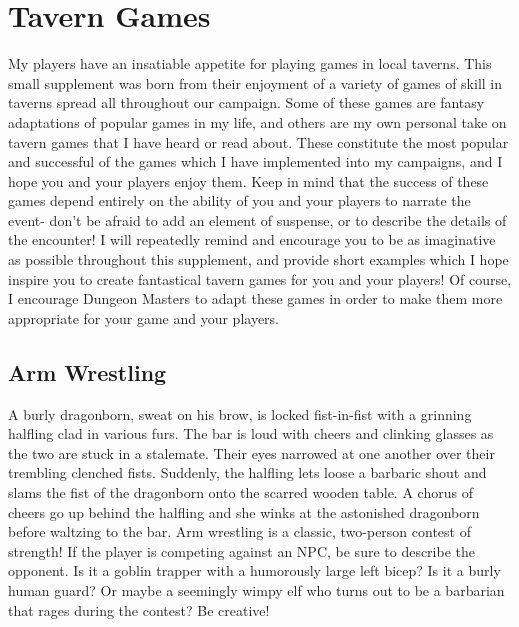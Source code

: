 \documentclass[10pt,a4paper,twoside,twocolumn,openany,nodeprecatedcode]{dndarticle}
\begin{document}
\raggedbottom
\section{Tavern Games}
My players have an insatiable appetite for playing games in local taverns. This small supplement was born from their enjoyment of a variety of games of skill in taverns spread all throughout our campaign. Some of these games are fantasy adaptations of popular games in my life, and others are my own personal take on tavern games that I have heard or read about. These constitute the most popular and successful of the games which I have implemented into my campaigns, and I hope you and your players enjoy them. Keep in mind that the success of these games depend entirely on the ability of you and your players to narrate the event- don't be afraid to add an element of suspense, or to describe the details of the encounter! I will repeatedly remind and encourage you to be as imaginative as possible throughout this supplement, and provide short examples which I hope inspire you to create fantastical tavern games for you and your players! Of course, I encourage Dungeon Masters to adapt these games in order to make them more appropriate for your game and your players.
\subsection{Arm Wrestling}
A burly dragonborn, sweat on his brow, is locked fist-in-fist with a grinning halfling clad in various furs. The bar is loud with cheers and clinking glasses as the two are stuck in a stalemate. Their eyes narrowed at one another over their trembling clenched fists. Suddenly, the halfling lets loose a barbaric shout and slams the fist of the dragonborn onto the scarred wooden table. A chorus of cheers go up behind the halfling and she winks at the astonished dragonborn before waltzing to the bar.
Arm wrestling is a classic, two-person contest of strength! If the player is competing against an NPC, be sure to describe the opponent. Is it a goblin trapper with a humorously large left bicep? Is it a burly human guard? Or maybe a seemingly wimpy elf who turns out to be a barbarian that rages during the contest? Be creative!
\end{document}
